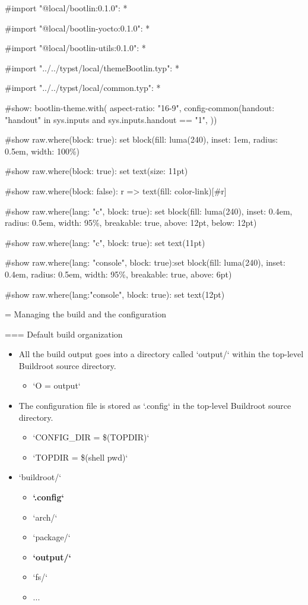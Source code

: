 
#import "@local/bootlin:0.1.0": *

#import "@local/bootlin-yocto:0.1.0": *

#import "@local/bootlin-utils:0.1.0": *

#import "../../typst/local/themeBootlin.typ": *

#import "../../typst/local/common.typ": *

#show: bootlin-theme.with( aspect-ratio: "16-9", config-common(handout: "handout" in sys.inputs and sys.inputs.handout == "1", ))

#show raw.where(block: true): set block(fill: luma(240), inset: 1em, radius: 0.5em, width: 100\%)

#show raw.where(block: true): set text(size: 11pt)

#show raw.where(block: false): r => text(fill: color-link)[#r]

#show raw.where(lang: "c", block: true): set block(fill: luma(240), inset: 0.4em, radius: 0.5em, width: 95\%, breakable: true, above: 12pt, below: 12pt)

#show raw.where(lang: "c", block: true): set text(11pt)

#show raw.where(lang: "console", block: true):set block(fill: luma(240), inset: 0.4em, radius: 0.5em, width: 95\%, breakable: true, above: 6pt)

#show raw.where(lang:"console", block: true): set text(12pt)

 = Managing the build and the configuration

=== {Default build organization}
  \begin{itemize}
  \item All the build output goes into a directory called
    `output/` within the top-level Buildroot source directory.
    \begin{itemize}
    \item `O = output`
    \end{itemize}
  \item The configuration file is stored as `.config` in the
    top-level Buildroot source directory.
    \begin{itemize}
    \item `CONFIG_DIR = \$(TOPDIR)`
    \item `TOPDIR = \$(shell pwd)`
    \end{itemize}
  \item `buildroot/`
    \begin{itemize}
    \item {\bf `.config`}
    \item `arch/`
    \item `package/`
    \item {\bf `output/`}
    \item `fs/`
    \item ...
    \end{itemize}
  \end{itemize}


